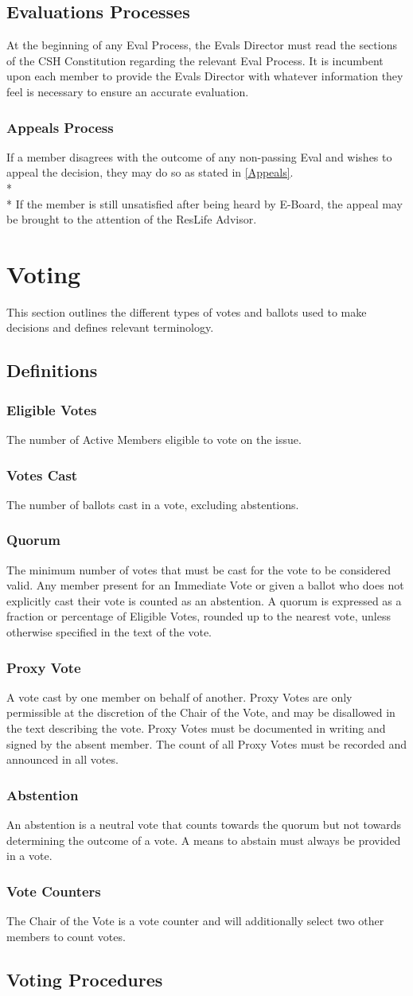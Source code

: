 \documentclass{article}
\newcommand{\article}[1]{\section{#1} \label{#1}}
\newcommand{\asection}[1]{\subsection{#1} \label{#1}}
\newcommand{\asubsection}[1]{\subsubsection{#1} \label{#1}}
\begin{document}
\asection{Evaluations Processes}
At the beginning of any Eval Process, the Evals Director must read the sections of the CSH Constitution regarding the relevant Eval Process.
It is incumbent upon each member to provide the Evals Director with whatever information they feel is necessary to ensure an accurate evaluation.

\asubsection{Appeals Process}
If a member disagrees with the outcome of any non-passing Eval and wishes to appeal the decision, they may do so as stated in \ref{Appeals}.
\\* \\*
If the member is still unsatisfied after being heard by E-Board, the appeal may be brought to the attention of the ResLife Advisor.

\article{Voting}
This section outlines the different types of votes and ballots used to make decisions and defines relevant terminology.

\asection{Definitions}

\asubsection{Eligible Votes}
The number of Active Members eligible to vote on the issue.

\asubsection{Votes Cast}
The number of ballots cast in a vote, excluding abstentions.

\asubsection{Quorum}
The minimum number of votes that must be cast for the vote to be considered valid.
Any member present for an Immediate Vote or given a ballot who does not explicitly cast their vote is counted as an abstention.
A quorum is expressed as a fraction or percentage of Eligible Votes, rounded up to the nearest vote, unless otherwise specified in the text of the vote.

\asubsection{Proxy Vote}
A vote cast by one member on behalf of another.
Proxy Votes are only permissible at the discretion of the Chair of the Vote, and may be disallowed in the text describing the vote.
Proxy Votes must be documented in writing and signed by the absent member.
The count of all Proxy Votes must be recorded and announced in all votes.

\asubsection{Abstention}
An abstention is a neutral vote that counts towards the quorum but not towards determining the outcome of a vote.
A means to abstain must always be provided in a vote.

\asubsection{Vote Counters}
The Chair of the Vote is a vote counter and will additionally select two other members to count votes.

\asection{Voting Procedures}
\end{document}
